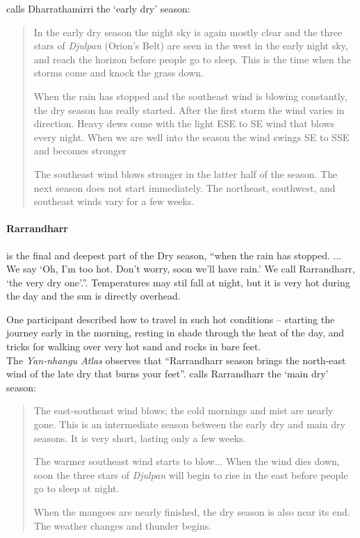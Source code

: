 \citet{davis1989} calls Dharrathamirri the `early dry' season:
\begin{quote}
    In the early dry season the night sky is again mostly clear and the three stars of
    \textit{Djulpan} (Orion's Belt) are seen in the west in the early night sky,
    and reach the horizon before people go to sleep.
    This is the time when the storms come and knock the grass down.

    When the rain has stopped and the southeast wind is blowing constantly,
    the dry season has really started.
    After the first storm the wind varies in direction.
    Heavy dews come with the light ESE to SE wind that blows every night.
    When we are well into the season the wind swings SE to SSE and becomes stronger

    The southeast wind blows stronger in the latter half of the season.
    The next season does not start immediately.
    The northeast, southwest, and southeast winds vary for a few weeks.
\end{quote}


\paragraph{Rarrandharr} is the final and deepest part of the Dry season,
``when the rain has stopped.  ... We say `Oh, I'm too hot.  Don't worry,
soon we'll have rain.'  We call Rarrandharr, `the very dry one'.''.
Temperatures may stil fall at night, but it is very hot during the day
and the sun is directly overhead.

One participant described how to travel in such hot conditions -- starting
the journey early in the morning, resting in shade through the heat of the
day, and tricks for walking over very hot sand and rocks in bare feet.\\

The \textit{Yan-nhangu Atlas} observes that ``Rarrandharr season brings
the north-east wind of the late dry that burns your feet''.
\citet{davis1989} calls Rarrandharr the `main dry' season:
\begin{quote}
    The east-southeast wind blows; the cold mornings and mist are nearly gone.
    This is an intermediate season between the early dry and main dry seasons.
    It is very short, lasting only a few weeks.

    The warmer southeast wind starts to blow...
    When the wind dies down, soon the three stars of \textit{Djulpan}
    will begin to rise in the east before people go to sleep at night.

    When the mangoes are nearly finished, the dry season is also near its end.
    The weather changes and thunder begins.
\end{quote}




